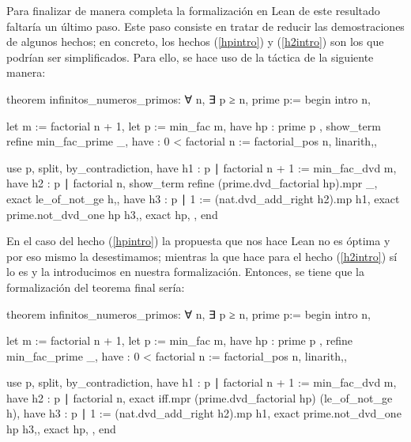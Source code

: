 Para finalizar de manera completa la formalización en Lean de este resultado
faltaría un último paso. Este paso consiste en tratar de reducir las
demostraciones de algunos hechos; en concreto, los hechos (\ref{hpintro}) y
(\ref{h2intro}) son los que podrían ser simplificados. Para ello, se hace
uso de la táctica  de la siguiente manera:
\begin{leancode}
theorem infinitos_numeros_primos:
  ∀ n, ∃ p ≥ n, prime p:=
begin
  intro n,

  let m := factorial n + 1,
  let p := min_fac m,
  have hp : prime p ,
  show_term{ refine min_fac_prime _,
    have : 0 < factorial n := factorial_pos n,
    linarith,},

  use p,
  split,
  { by_contradiction,
    have h1 : p ∣ factorial n + 1 := min_fac_dvd m,
    have h2 : p ∣ factorial n,
    show_term{ refine (prime.dvd_factorial hp).mpr _,
      exact le_of_not_ge h,},
    have h3 : p ∣ 1 := (nat.dvd_add_right h2).mp h1,
    exact prime.not_dvd_one hp h3,},
  { exact hp, },
end
\end{leancode}

En el caso del hecho (\ref{hpintro}) la propuesta que nos hace Lean no es óptima
y por eso mismo la desestimamos; mientras la que hace para el hecho
(\ref{h2intro}) sí lo es y la introducimos en nuestra formalización. Entonces,
se tiene que la formalización del teorema final sería:
\begin{leancode}
theorem infinitos_numeros_primos:
  ∀ n, ∃ p ≥ n, prime p:=
begin
  intro n,

  let m := factorial n + 1,
  let p := min_fac m,
  have hp : prime p ,
  { refine min_fac_prime _,
    have : 0 < factorial n := factorial_pos n,
    linarith,},

  use p,
  split,
  { by_contradiction,
    have h1 : p ∣ factorial n + 1 := min_fac_dvd m,
    have h2 : p ∣ factorial n,
    exact iff.mpr (prime.dvd_factorial hp) (le_of_not_ge h),
    have h3 : p ∣ 1 := (nat.dvd_add_right h2).mp h1,
    exact prime.not_dvd_one hp h3,},
  { exact hp, },
end
\end{leancode}



